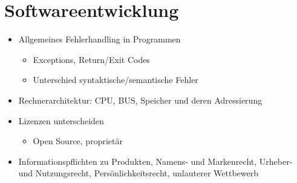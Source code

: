 \section{Softwareentwicklung}
\label{sec:Softwareentwicklung}

\begin{itemize}
	\item Allgemeines Fehlerhandling in Programmen
	\begin{itemize}
		\item Exceptions, Return/Exit Codes
		\item Unterschied syntaktische/semantische Fehler
	\end{itemize}
	\item Rechnerarchitektur: CPU, BUS, Speicher und deren Adressierung
	\item Lizenzen unterscheiden
	\begin{itemize}
		\item Open Source, proprietär
	\end{itemize}
	\item Informationspflichten zu Produkten, Namens- und Markenrecht, Urheber- und Nutzungsrecht, Persönlichkeitsrecht, unlauterer Wettbewerb
\end{itemize}







\newpage

\newpage






